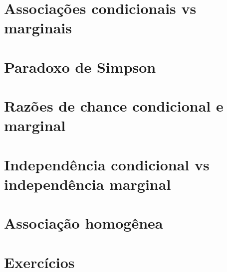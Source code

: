 \documentclass[]{book}
\begin{document}
\hypertarget{associacoes-condicionais-vs-marginais}{%
\section{Associações condicionais vs marginais}\label{associacoes-condicionais-vs-marginais}}

\hypertarget{paradoxo-de-simpson}{%
\section{Paradoxo de Simpson}\label{paradoxo-de-simpson}}

\hypertarget{razoes-de-chance-condicional-e-marginal}{%
\section{Razões de chance condicional e marginal}\label{razoes-de-chance-condicional-e-marginal}}

\hypertarget{independencia-condicional-vs-independencia-marginal}{%
\section{Independência condicional vs independência marginal}\label{independencia-condicional-vs-independencia-marginal}}

\hypertarget{associacao-homogenea}{%
\section{Associação homogênea}\label{associacao-homogenea}}

\hypertarget{exercicios}{%
\section{Exercícios}\label{exercicios}}


\end{document}
